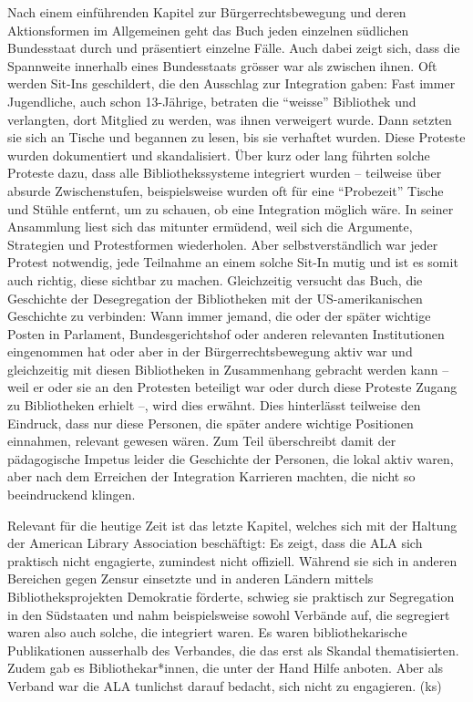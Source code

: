 \documentclass[a4paper,
fontsize=11pt,
oneside,
numbers=noperiodatend,
parskip=half-,
bibliography=totoc,
final
]{scrartcl}
\begin{document}
Nach einem einführenden Kapitel zur Bürgerrechtsbewegung und deren
Aktionsformen im Allgemeinen geht das Buch jeden einzelnen südlichen
Bundesstaat durch und präsentiert einzelne Fälle. Auch dabei zeigt sich,
dass die Spannweite innerhalb eines Bundesstaats grösser war als
zwischen ihnen. Oft werden Sit-Ins geschildert, die den Ausschlag zur
Integration gaben: Fast immer Jugendliche, auch schon 13-Jährige,
betraten die \enquote{weisse} Bibliothek und verlangten, dort Mitglied
zu werden, was ihnen verweigert wurde. Dann setzten sie sich an Tische
und begannen zu lesen, bis sie verhaftet wurden. Diese Proteste wurden
dokumentiert und skandalisiert. Über kurz oder lang führten solche
Proteste dazu, dass alle Bibliothekssysteme integriert wurden --
teilweise über absurde Zwischenstufen, beispielsweise wurden oft für
eine \enquote{Probezeit} Tische und Stühle entfernt, um zu schauen, ob
eine Integration möglich wäre. In seiner Ansammlung liest sich das
mitunter ermüdend, weil sich die Argumente, Strategien und Protestformen
wiederholen. Aber selbstverständlich war jeder Protest notwendig, jede
Teilnahme an einem solche Sit-In mutig und ist es somit auch richtig,
diese sichtbar zu machen. Gleichzeitig versucht das Buch, die Geschichte
der Desegregation der Bibliotheken mit der US-amerikanischen Geschichte
zu verbinden: Wann immer jemand, die oder der später wichtige Posten in
Parlament, Bundesgerichtshof oder anderen relevanten Institutionen
eingenommen hat oder aber in der Bürgerrechtsbewegung aktiv war und
gleichzeitig mit diesen Bibliotheken in Zusammenhang gebracht werden
kann -- weil er oder sie an den Protesten beteiligt war oder durch diese
Proteste Zugang zu Bibliotheken erhielt --, wird dies erwähnt. Dies
hinterlässt teilweise den Eindruck, dass nur diese Personen, die später
andere wichtige Positionen einnahmen, relevant gewesen wären. Zum Teil
überschreibt damit der pädagogische Impetus leider die Geschichte der
Personen, die lokal aktiv waren, aber nach dem Erreichen der Integration
Karrieren machten, die nicht so beeindruckend klingen.

Relevant für die heutige Zeit ist das letzte Kapitel, welches sich mit
der Haltung der American Library Association beschäftigt: Es zeigt, dass
die ALA sich praktisch nicht engagierte, zumindest nicht offiziell.
Während sie sich in anderen Bereichen gegen Zensur einsetzte und in
anderen Ländern mittels Bibliotheksprojekten Demokratie förderte,
schwieg sie praktisch zur Segregation in den Südstaaten und nahm
beispielsweise sowohl Verbände auf, die segregiert waren also auch
solche, die integriert waren. Es waren bibliothekarische Publikationen
ausserhalb des Verbandes, die das erst als Skandal thematisierten. Zudem
gab es Bibliothekar*innen, die unter der Hand Hilfe anboten. Aber als
Verband war die ALA tunlichst darauf bedacht, sich nicht zu engagieren.
(ks)
\end{document}
